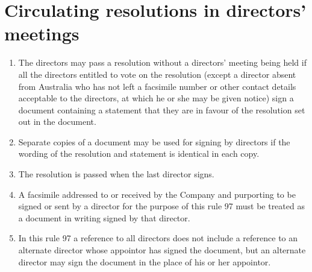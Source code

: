 \section{Circulating resolutions in directors' meetings}

\begin{enumerate}[label=(\alph*)]
    \item The directors may pass a resolution without a directors' meeting being held if all the directors entitled to vote on the resolution (except a director absent from Australia who has not left a facsimile number or other contact details acceptable to the directors, at which he or she may be given notice) sign a document containing a statement that they are in favour of the resolution set out in the document.
    
    \item Separate copies of a document may be used for signing by directors if the wording of the resolution and statement is identical in each copy.
    
    \item The resolution is passed when the last director signs.
    
    \item A facsimile addressed to or received by the Company and purporting to be signed or sent by a director for the purpose of this rule 97 must be treated as a document in writing signed by that director.
    
    \item In this rule 97 a reference to all directors does not include a reference to an alternate director whose appointor has signed the document, but an alternate director may sign the document in the place of his or her appointor.
\end{enumerate} 